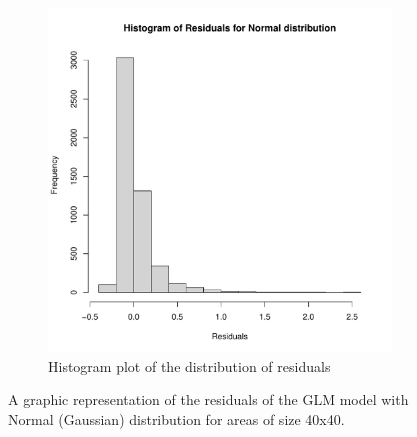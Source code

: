 \documentclass[12pt,a4paper,twoside]{article}
\begin{document}
\begin{figure}[!ht]
\begin{subfigure}{.45\textwidth}
        \includegraphics[width=\linewidth]{img/Normal_distribution_histogram_40x40.pdf}
        \caption{Histogram plot of the distribution of residuals}
        \label{fig:gaussianhist40}
    \end{subfigure}
    \caption{A graphic representation of the residuals of the GLM model with Normal (Gaussian)
        distribution for areas of size 40x40.}
    \label{fig:gaussianfig40}
\end{figure}
\end{document}
